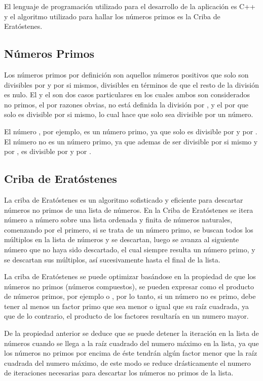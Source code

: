 \documentclass[12pt]{article}
\begin{document}
El lenguaje de programación utilizado para el desarrollo de la aplicación es C++
y el algoritmo utilizado para hallar los números primos es la Criba de
Eratóstenes.

\subsection{Números Primos}

Los números primos por definición son aquellos números positivos que solo son
divisibles por  y por si mismos, divisibles en términos de que el resto
de la división es nulo. El  y el  son dos casos particulares en
los cuales ambos son considerados no primos, el  por razones obvias, no
está definida la división por , y el  por que solo es divisible
por si mismo, lo cual hace que solo sea divisible por un número.

El número , por ejemplo, es un número primo, ya que solo es divisible
por  y por . El número  no es un número primo, ya que
ademas de ser divisible por si mismo y por , es divisible por  y
por .

\subsection{Criba de Eratóstenes}

La criba de Eratóstenes es un algoritmo sofisticado y eficiente para descartar
números no primos de una lista de números. En la Criba de Eratóstenes se itera
número a número sobre una lista ordenada y finita de números naturales,
comenzando por el primero, si se trata de un número primo, se buscan todos los
múltiplos en la lista de números y se descartan, luego se avanza al siguiente
número que no haya sido descartado, el cual siempre resulta un número primo, y
se descartan sus múltiplos, así sucesivamente hasta el final de la lista. 

La criba de Eratóstenes se puede optimizar basándose en la propiedad de que los
números no primos (números compuestos), se pueden expresar como el producto de
números primos, por ejemplo  o , por lo tanto, si
un número no es primo, debe tener al menos un factor primo que sea menor o igual
que su raíz cuadrada, ya que de lo contrario, el producto de los factores
resultaría en un numero mayor.

De la propiedad anterior se deduce que se puede detener la iteración en la lista
de números cuando se llega a la raíz cuadrado del numero máximo en la lista, ya
que los números no primos por encima de éste tendrán algún factor menor que la
raíz cuadrada del numero máximo, de este modo se reduce drásticamente el numero
de iteraciones necesarias para descartar los números no primos de la lista.
\end{document}
